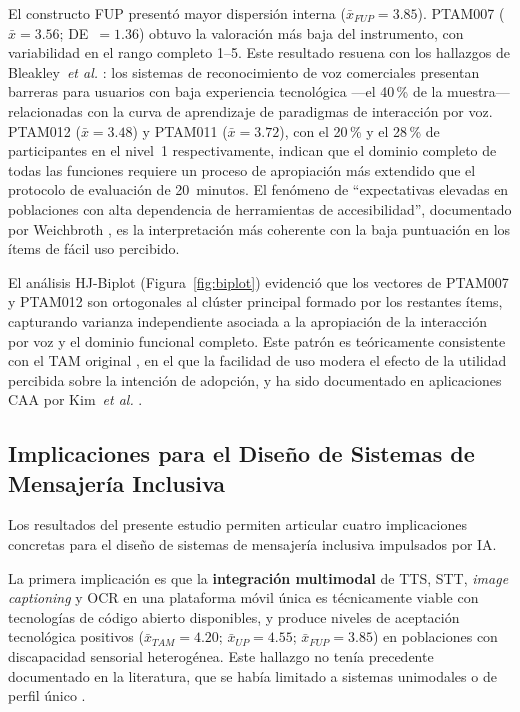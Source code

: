 \documentclass[journal]{IEEEtran}
\begin{document}
	El constructo FUP present\'o mayor dispersi\'on interna ($\bar{x}_{FUP}=3.85$). PTAM007 ($\bar{x}=3.56$; DE~$=1.36$) obtuvo la valoraci\'on m\'as baja del instrumento, con variabilidad en el rango completo 1--5. Este resultado resuena con los hallazgos de Bleakley~\textit{et al.} \cite{bleakley2022}: los sistemas de reconocimiento de voz comerciales presentan barreras para usuarios con baja experiencia tecnol\'ogica ---el 40\,\% de la muestra--- relacionadas con la curva de aprendizaje de paradigmas de interacci\'on por voz. PTAM012 ($\bar{x}=3.48$) y PTAM011 ($\bar{x}=3.72$), con el 20\,\% y el 28\,\% de participantes en el nivel~1 respectivamente, indican que el dominio completo de todas las funciones requiere un proceso de apropiaci\'on m\'as extendido que el protocolo de evaluaci\'on de 20~minutos. El fen\'omeno de ``expectativas elevadas en poblaciones con alta dependencia de herramientas de accesibilidad'', documentado por Weichbroth \cite{weichbroth2020}, es la interpretaci\'on m\'as coherente con la baja puntuaci\'on en los \'items de f\'acil uso percibido.
	
	El an\'alisis HJ-Biplot (Figura~\ref{fig:biplot}) evidenci\'o que los vectores de PTAM007 y PTAM012 son ortogonales al cl\'uster principal formado por los restantes \'items, capturando varianza independiente asociada a la apropiaci\'on de la interacci\'on por voz y el dominio funcional completo. Este patr\'on es te\'oricamente consistente con el TAM original \cite{davis1989}, en el que la facilidad de uso modera el efecto de la utilidad percibida sobre la intenci\'on de adopci\'on, y ha sido documentado en aplicaciones CAA por Kim~\textit{et al.} \cite{kim2024}.
	
	\subsection{Implicaciones para el Dise\~no de Sistemas de Mensajer\'ia Inclusiva}
	Los resultados del presente estudio permiten articular cuatro implicaciones concretas para el dise\~no de sistemas de mensajer\'ia inclusiva impulsados por IA.
	
	La primera implicaci\'on es que la \textbf{integraci\'on multimodal} de TTS, STT, \textit{image captioning} y OCR en una plataforma m\'ovil \'unica es t\'ecnicamente viable con tecnolog\'ias de c\'odigo abierto disponibles, y produce niveles de aceptaci\'on tecnol\'ogica positivos ($\bar{x}_{TAM}=4.20$; $\bar{x}_{UP}=4.55$; $\bar{x}_{FUP}=3.85$) en poblaciones con discapacidad sensorial heterog\'enea. Este hallazgo no ten\'ia precedente documentado en la literatura, que se hab\'ia limitado a sistemas unimodales \cite{guerrero2021bellchat} o de perfil \'unico \cite{stefanov2024, yeratziotis2023}.
	
\end{document}
